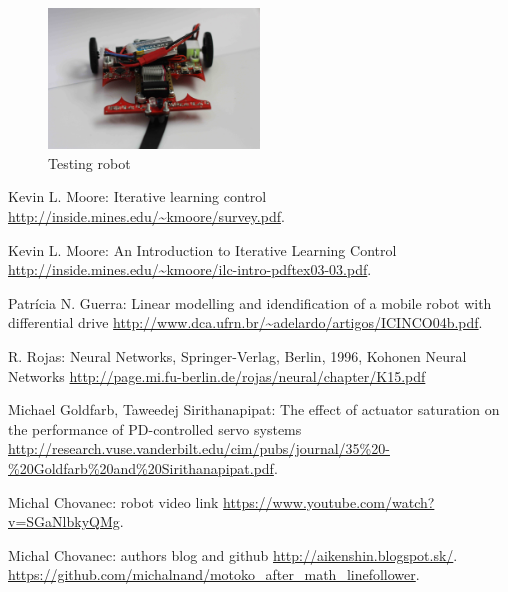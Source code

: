 \documentclass[twoside]{oss-conf-eng}
\begin{document}
\begin{figure}[]
    \centering
    \includegraphics[width=0.5\textwidth]{motoko_aftermath_front.jpg}
    \caption{Testing robot}
    \label{fig:robot}
\end{figure}


\begin{thebibliography}{99}

Kevin L. Moore: Iterative learning control
\url{http://inside.mines.edu/~kmoore/survey.pdf}.

Kevin L. Moore: An Introduction to Iterative Learning Control
\url{http://inside.mines.edu/~kmoore/ilc-intro-pdftex03-03.pdf}.

Patrícia N. Guerra: Linear modelling and idendification of a mobile robot with
differential drive
\url{http://www.dca.ufrn.br/~adelardo/artigos/ICINCO04b.pdf}.

R. Rojas: Neural Networks, Springer-Verlag, Berlin, 1996, Kohonen Neural Networks
\url{http://page.mi.fu-berlin.de/rojas/neural/chapter/K15.pdf}

Michael Goldfarb, Taweedej Sirithanapipat:
The effect of actuator saturation on the performance of PD-controlled servo systems
\url{http://research.vuse.vanderbilt.edu/cim/pubs/journal/35%20-%20Goldfarb%20and%20Sirithanapipat.pdf}.

Michal Chovanec: robot video link
\url{https://www.youtube.com/watch?v=SGaNlbkyQMg}.

Michal Chovanec: authors blog and github
\url{http://aikenshin.blogspot.sk/}.
\url{https://github.com/michalnand/motoko_after_math_linefollower}.

\end{thebibliography}
\end{document}
